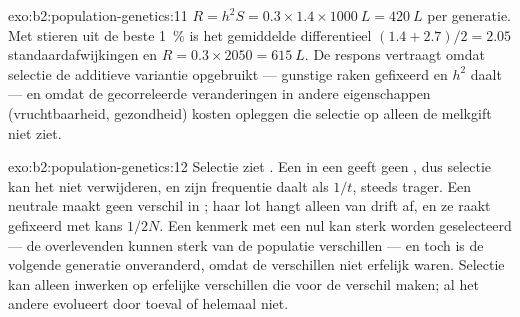 \begin{solution}{exo:b2:population-genetics:11}
$R = h^{2}S = 0.3\times 1.4\times \qty{1000}{L} = \qty{420}{L}$ per
generatie. Met stieren uit de beste \qty{1}{\%} is het gemiddelde
differentieel $(1.4 + 2.7)/2 = 2.05$ standaardafwijkingen en $R =
0.3\times 2050 = \qty{615}{L}$. De respons vertraagt omdat selectie
de additieve variantie opgebruikt --- gunstige  raken gefixeerd
en $h^{2}$ daalt --- en omdat de gecorreleerde veranderingen in andere
eigenschappen (vruchtbaarheid, gezondheid) kosten opleggen die selectie op
alleen de melkgift niet ziet.
\end{solution}

\begin{solution}{exo:b2:population-genetics:12}
Selectie ziet . Een   in een  geeft geen
, dus selectie kan het niet verwijderen, en zijn frequentie daalt als
$1/t$, steeds trager. Een neutrale  maakt geen verschil in ;
haar lot hangt alleen van drift af, en ze raakt gefixeerd met kans $1/2N$. Een
kenmerk met een  nul
kan sterk worden geselecteerd --- de overlevenden kunnen sterk van de
populatie verschillen --- en toch is de volgende generatie onveranderd, omdat
de verschillen niet erfelijk waren. Selectie kan alleen inwerken op erfelijke
verschillen die voor de  verschil maken; al het andere evolueert door
toeval of helemaal niet.
\end{solution}

